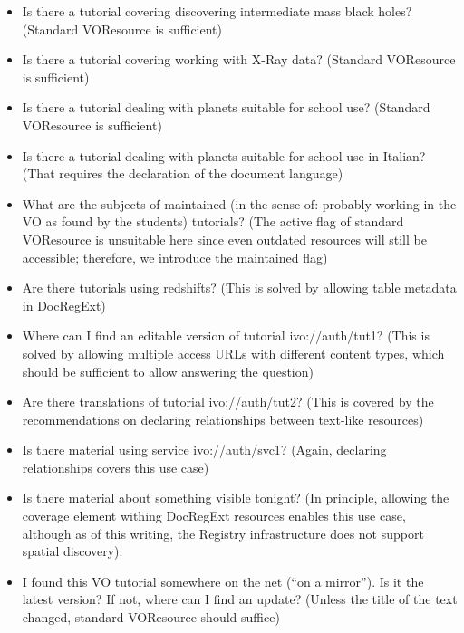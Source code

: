 \documentclass{ivoa}
\begin{document}
\begin{itemize}

\item Is there a tutorial covering discovering intermediate mass black
holes? (Standard VOResource is sufficient){}

\item Is there a tutorial covering working with X-Ray data? (Standard
VOResource is sufficient){}

\item Is there a tutorial dealing with planets suitable for school use?
(Standard VOResource is sufficient){}

\item Is there a tutorial dealing with planets suitable for school use in
Italian? (That requires the declaration of the document language){}

\item What are the subjects of maintained (in the sense of: probably
working in the VO as found by the students) tutorials?
(The active flag of standard VOResource is
unsuitable here since even outdated resources will still be accessible;
therefore, we introduce the maintained flag){}

\item Are there tutorials using redshifts? (This is solved by allowing
table metadata in DocRegExt){}

\item Where can I find an editable version of tutorial ivo://auth/tut1?
(This is solved by allowing multiple access URLs with different content
types, which should be sufficient to allow answering the question){}

\item Are there translations of tutorial ivo://auth/tut2? (This is covered
by the recommendations on declaring relationships between text-like
resources){}

\item Is there material using service ivo://auth/svc1? (Again, declaring
relationships covers this use case){}

\item Is there material about something visible tonight? (In principle,
allowing the coverage element withing DocRegExt resources enables this
use case, although as of this writing, the Registry infrastructure does
not support spatial discovery).

\item I found this VO tutorial somewhere on the net (``on a mirror'').  Is it
the latest version?  If not, where can I find an update? (Unless the
title of the text changed, standard VOResource should suffice){}

\end{itemize}
\end{document}
